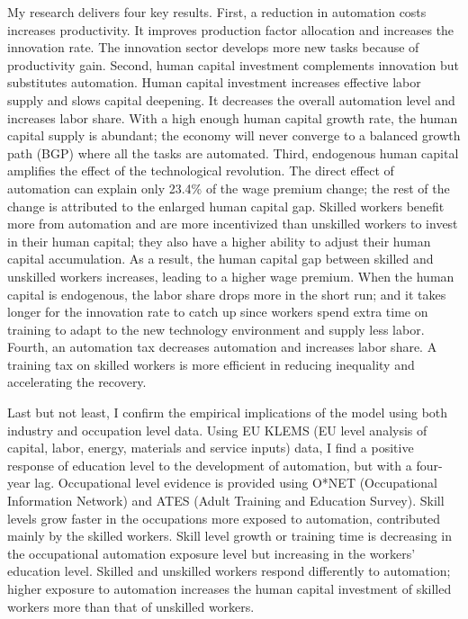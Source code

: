 \documentclass[12pt]{article}
\begin{document}
My research delivers four key results. First, a reduction in automation costs increases productivity. It improves production factor allocation and increases the innovation rate. The innovation sector develops more new tasks because of productivity gain. Second, human capital investment complements innovation but substitutes automation. Human capital investment increases effective labor supply and slows capital deepening. It decreases the overall automation level and increases labor share. With a high enough human capital growth rate, the human capital supply is abundant; the economy will never converge to a balanced growth path (BGP) where all the tasks are automated. Third, endogenous human capital amplifies the effect of the technological revolution. The direct effect of automation can explain only 23.4\% of the wage premium change; the rest of the change is attributed to the enlarged human capital gap. Skilled workers benefit more from automation and are more incentivized than unskilled workers to invest in their human capital; they also have a higher ability to adjust their human capital accumulation. As a result, the human capital gap between skilled and unskilled workers increases, leading to a higher wage premium. When the human capital is endogenous, the labor share drops more in the short run; and it takes longer for the innovation rate to catch up since workers spend extra time on training to adapt to the new technology environment and supply less labor. Fourth, an automation tax decreases automation and increases labor share. A training tax on skilled workers is more efficient in reducing inequality and accelerating the recovery. 

Last but not least, I confirm the empirical implications of the model using both industry and occupation level data. Using EU KLEMS (EU level analysis of capital, labor, energy, materials and service inputs) data, I find a positive response of education level to the development of automation, but with a four-year lag. Occupational level evidence is provided using O*NET (Occupational Information Network) and ATES (Adult Training and Education Survey). Skill levels grow faster in the occupations more exposed to automation, contributed mainly by the skilled workers. Skill level growth or training time is decreasing in the occupational automation exposure level but increasing in the workers' education level. Skilled and unskilled workers respond differently to automation; higher exposure to automation increases the human capital investment of skilled workers more than that of unskilled workers. 
\end{document}
